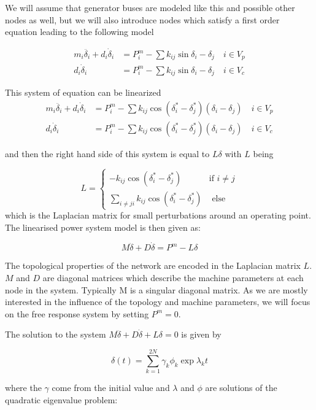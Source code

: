 %

We will assume that generator buses are modeled like this and possible other nodes as well, but we will also introduce nodes which satisfy a first order equation leading to the following model

\begin{align}
m_i\ddot{\delta_i}+d_i\dot{\delta}_i&=P_i^m-\sum k_{ij}\sin{\delta_i-\delta_j}\quad i\in V_p\\
d_i\dot{\delta}_i&=P_i^m-\sum k_{ij}\sin{\delta_i-\delta_j}\quad i\in      V_c
\end{align}


This system of equation can be linearized
\begin{align*}
m_i\ddot{\delta_i}+d_i\dot{\delta}_i&=P_i^m-\sum k_{ij}
\cos{(\delta^*_i-\delta^*_j)}(\delta_i-\delta_j)\quad i\in V_p\\
d_i\dot{\delta}_i&=P_i^m-\sum k_{ij}\cos{(\delta^*_i-\delta^*_j)}(\delta_i-\delta_j)\quad i\in V_c
\end{align*}

and then the right hand side of this system is equal to $L\delta$ with $L$ being

\[L=\left\{\begin{matrix}-k_{ij}\cos{(\delta_i^*-
\delta^*_j)} &\mbox{if } i\neq j\\
\sum_{i\neq ji}k_{ij}\cos{(\delta_i^*-
\delta^*_j)}&\mbox{ else}\end{matrix}\right.\]
which is the Laplacian matrix for small perturbations around an operating point.
The linearised power system model is then given
as:

\[M\ddot{\delta}+D\dot{\delta} =P^m-L\delta\]

The topological properties of the network are encoded in the Laplacian matrix $L$.
$M$ and $D$ are diagonal matrices which describe the machine parameters at each node
in the system. Typically M is a singular diagonal
matrix. As we are mostly interested in the influence of the topology and
machine parameters, we will focus on the free response system by setting $P^m = 0$.

The solution to the system $M\ddot{\delta}+D\dot{\delta}+L\delta=0$ is given by 

\[\delta(t)=\sum_{k=1}^{2N} \gamma_k\phi_k\exp{\lambda_k t}\]

where the $\gamma$ come from the initial value and $\lambda$ and $\phi$ are solutions of the quadratic eigenvalue problem:

